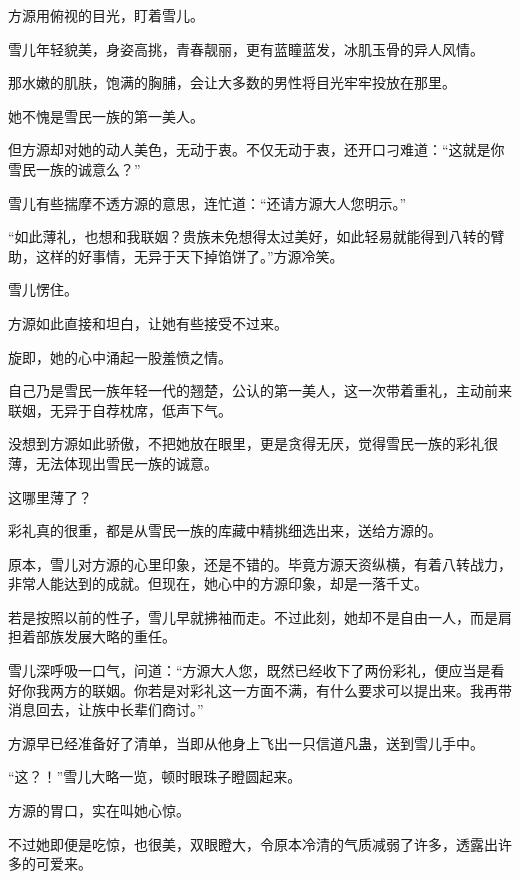 
\begin{this_body}



方源用俯视的目光，盯着雪儿。

雪儿年轻貌美，身姿高挑，青春靓丽，更有蓝瞳蓝发，冰肌玉骨的异人风情。

那水嫩的肌肤，饱满的胸脯，会让大多数的男性将目光牢牢投放在那里。

她不愧是雪民一族的第一美人。

但方源却对她的动人美色，无动于衷。不仅无动于衷，还开口刁难道：“这就是你雪民一族的诚意么？”

雪儿有些揣摩不透方源的意思，连忙道：“还请方源大人您明示。”

“如此薄礼，也想和我联姻？贵族未免想得太过美好，如此轻易就能得到八转的臂助，这样的好事情，无异于天下掉馅饼了。”方源冷笑。

雪儿愣住。

方源如此直接和坦白，让她有些接受不过来。

旋即，她的心中涌起一股羞愤之情。

自己乃是雪民一族年轻一代的翘楚，公认的第一美人，这一次带着重礼，主动前来联姻，无异于自荐枕席，低声下气。

没想到方源如此骄傲，不把她放在眼里，更是贪得无厌，觉得雪民一族的彩礼很薄，无法体现出雪民一族的诚意。

这哪里薄了？

彩礼真的很重，都是从雪民一族的库藏中精挑细选出来，送给方源的。

原本，雪儿对方源的心里印象，还是不错的。毕竟方源天资纵横，有着八转战力，非常人能达到的成就。但现在，她心中的方源印象，却是一落千丈。

若是按照以前的性子，雪儿早就拂袖而走。不过此刻，她却不是自由一人，而是肩担着部族发展大略的重任。

雪儿深呼吸一口气，问道：“方源大人您，既然已经收下了两份彩礼，便应当是看好你我两方的联姻。你若是对彩礼这一方面不满，有什么要求可以提出来。我再带消息回去，让族中长辈们商讨。”

方源早已经准备好了清单，当即从他身上飞出一只信道凡蛊，送到雪儿手中。

“这？！”雪儿大略一览，顿时眼珠子瞪圆起来。

方源的胃口，实在叫她心惊。

不过她即便是吃惊，也很美，双眼瞪大，令原本冷清的气质减弱了许多，透露出许多的可爱来。


\end{this_body}
